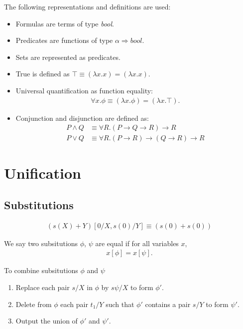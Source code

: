 \documentclass{article}
\begin{document}
\begin{definition}
	The following representations and definitions are used:
	\begin{itemize}
		\item Formulas are terms of type \textit{bool}.
		\item Predicates are functions of type $\alpha\Rightarrow\textit{bool}$.
		\item Sets are represented as predicates.
		\item True is defined as $\top \equiv (\lambda x.x)=(\lambda x.x)$.
		\item Universal quantification as function equality: \begin{align*}
			      \forall x. \phi \equiv (\lambda x. \phi) = (\lambda x. \top).
		      \end{align*}
		\item Conjunction and disjunction are defined as: \begin{align*}
			      P\wedge Q & \equiv \forall R. (P\rightarrow Q \rightarrow R) \rightarrow R               \\
			      P\vee Q   & \equiv \forall R. (P\rightarrow R)\rightarrow (Q\rightarrow R) \rightarrow R
		      \end{align*}
	\end{itemize}
\end{definition}

\section{Unification}

\subsection{Substitutions}

\begin{example}
	\begin{align*}
		(s(X)+Y)[0/X,s(0)/Y]\equiv (s(0)+s(0))
	\end{align*}
\end{example}

\begin{definition}
	We say two subsitutions $\phi$, $\psi$ are equal if for all variables $x$,
	\begin{align*}
		x[\phi] = x[\psi].
	\end{align*}
\end{definition}

\begin{definition}
	To combine subsitutions $\phi$ and $\psi$
	\begin{enumerate}
		\item Replace each pair $s/X$ in $\phi$ by $s\psi/X$ to form $\phi'$.
		\item Delete from $\phi$ each pair $t_1/Y$ such that $\phi'$ contains a pair $s/Y$ to form $\psi'$.
		\item Output the union of $\phi'$ and $\psi'$.
	\end{enumerate}
\end{definition}
\end{document}
